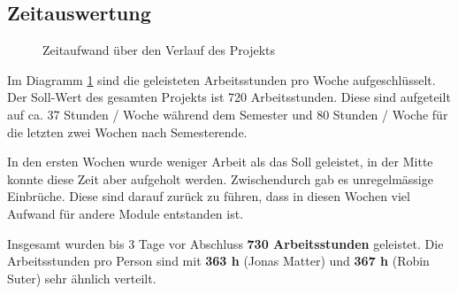 \subsection{Zeitauswertung}
\label{sub:Zeitauswertung}

\begin{figure}[H]
    \centering

    \caption[Diagramm Zeitaufwand über den Verlauf des Projekts]{Zeitaufwand über den Verlauf des Projekts}
    \label{chart:Zeitauswertung_weeks}
\end{figure}

Im Diagramm \ref{chart:Zeitauswertung_weeks} sind die geleisteten Arbeitsstunden pro Woche aufgeschlüsselt.
Der Soll-Wert des gesamten Projekts ist 720 Arbeitsstunden.
Diese sind aufgeteilt auf ca. 37 Stunden / Woche während dem Semester und 80 Stunden / Woche für die letzten zwei Wochen nach Semesterende.

In den ersten Wochen wurde weniger Arbeit als das Soll geleistet, in der Mitte konnte diese Zeit aber aufgeholt werden.
Zwischendurch gab es unregelmässige Einbrüche.
Diese sind darauf zurück zu führen, dass in diesen Wochen viel Aufwand für andere Module entstanden ist.

Insgesamt wurden bis 3 Tage vor Abschluss \textbf{730 Arbeitsstunden} geleistet.
Die Arbeitsstunden pro Person sind mit \textbf{363 h} (Jonas Matter) und \textbf{367 h} (Robin Suter) sehr ähnlich verteilt.


